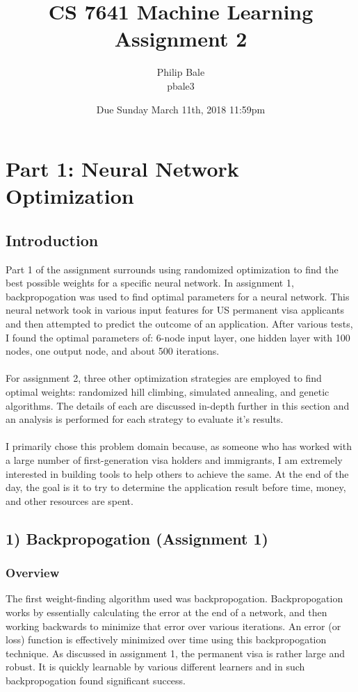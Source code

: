 \documentclass[h]{article}
\title{CS 7641 Machine Learning \\ Assignment 2}
\date{Due Sunday March 11th, 2018 11:59pm}
\author{Philip Bale \\ pbale3}
\begin{document}
\maketitle

\section*{Part 1: Neural Network Optimization}
\subsection*{ Introduction}  
Part 1 of the assignment surrounds using randomized optimization to find the 
best possible weights for a specific neural network.  In assignment 1, backpropogation 
was used to find optimal parameters for a neural network.  This neural network 
took in various input features for US permanent visa applicants and then 
attempted to predict the outcome of an application.  After various tests, I found the optimal parameters of: 6-node input layer, one hidden layer with 100 nodes, 
one output node, and about 500 iterations.
\\ \\
For assignment 2, three other optimization strategies are employed to find 
optimal weights: randomized hill climbing, simulated annealing, and genetic 
algorithms.  The details of each are discussed in-depth further in this section 
and an analysis is performed for each strategy to evaluate it's results.
\\ \\ 
I primarily chose this problem domain because, as someone who has worked 
with a large number of first-generation visa holders and immigrants, I am 
extremely interested in building tools to help others to achieve the same.  At the end of the day, the goal is it to try to determine the application result 
before time, money, and other resources are spent.

\subsection*{1) Backpropogation (Assignment 1)}  
\subsubsection*{Overview}
The first weight-finding algorithm used was backpropogation.  Backpropogation works by essentially calculating 
the error at the end of a network, and then working backwards to minimize that error over various iterations. 
 An error (or loss) function is effectively minimized over time using this backpropogation technique.   As discussed in assignment 1, the permanent 
 visa is rather large and robust.  It is quickly learnable by various different 
 learners and in such backpropogation found significant success.
 
\end{document}
